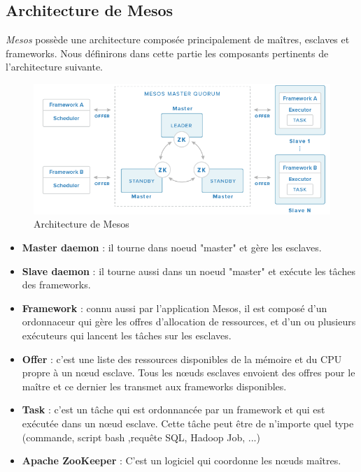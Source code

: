 \begin{onehalfspace}
\subsection{Architecture de Mesos}
\emph{Mesos} possède une architecture composée principalement de maîtres, esclaves et frameworks. Nous définirons dans cette partie les composants pertinents de l'architecture suivante.
\begin{figure}[H]
\centering
\includegraphics [scale=0.65]{chapitre3/assets/mesosarch.png}
\caption{Architecture de Mesos}
\end{figure}
\begin{itemize}
\item \textbf{Master daemon} : il tourne dans noeud "master" et gère les esclaves.
\item \textbf{Slave daemon} : il tourne aussi dans un noeud "master" et exécute les tâches des frameworks.
\item \textbf{Framework} : connu aussi par l'application Mesos, il est composé d'un ordonnaceur qui gère les offres d'allocation de ressources, et d'un ou plusieurs exécuteurs qui lancent les tâches sur les esclaves.
\item \textbf{Offer} : c'est une liste des ressources disponibles de la mémoire et du CPU propre à un nœud esclave. Tous les nœuds esclaves envoient des offres pour le maître  et ce dernier les transmet aux frameworks disponibles.
\item  \textbf{Task} : c'est un tâche qui est ordonnancée par un framework et qui est exécutée dans un nœud esclave. Cette tâche peut être de n'importe quel type (commande, script bash ,requête SQL, Hadoop Job, ...)
\item \textbf{Apache ZooKeeper }: C'est un logiciel qui coordonne les nœuds maîtres.
\end{itemize}

\end{onehalfspace}
